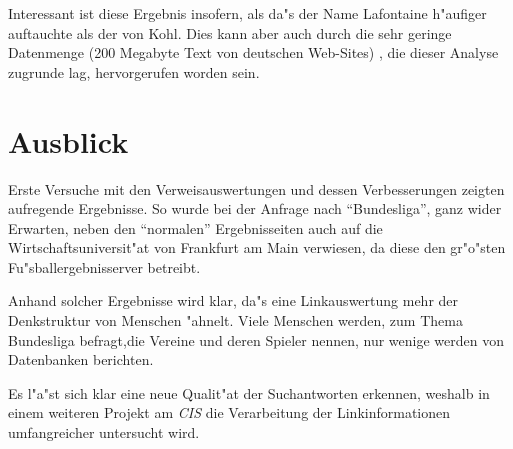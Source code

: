Interessant ist diese Ergebnis insofern, als da"s der Name Lafontaine h"aufiger auftauchte als der von Kohl. Dies kann aber auch durch die sehr geringe Datenmenge (200 Megabyte Text von deutschen Web-Sites) , die dieser Analyse zugrunde lag, hervorgerufen worden sein.


\section{Ausblick}

Erste Versuche mit den Verweisauswertungen und dessen Verbesserungen zeigten aufregende Ergebnisse. So wurde bei der Anfrage nach "`Bundesliga"', ganz wider Erwarten, neben den "`normalen"' Ergebnisseiten auch auf die Wirtschaftsuniversit"at von Frankfurt am Main verwiesen, da diese den gr"o"sten Fu"sballergebnisserver betreibt.

Anhand solcher Ergebnisse wird klar, da"s eine Linkauswertung mehr der Denkstruktur von Menschen "ahnelt. Viele Menschen werden, zum Thema Bundesliga befragt,die Vereine und deren Spieler nennen, nur wenige werden von Datenbanken berichten.

Es l"a"st sich klar eine neue Qualit"at der Suchantworten erkennen, weshalb in einem weiteren Projekt am {\em CIS} die Verarbeitung der Linkinformationen umfangreicher untersucht wird.




